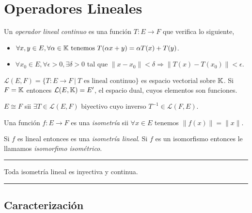 \section*{Operadores Lineales}

\begin{definition}
    Un \emph{operador lineal continuo} es una función \(T:E\to F \) que verifica lo siguiente, 
    \begin{itemize}
        \item \(\forall x,y \in E,\forall \alpha \in \mathbb{K} \ \text{tenemos } T(\alpha x+y) =  \alpha T(x) + T(y)\). 
        \item \(\forall x_0 \in E,\forall \epsilon > 0, \exists \delta > 0\) tal que \(\|x-x_0\|<\delta \Rightarrow \|T(x)-T(x_0)\|<\epsilon\). 
    \end{itemize}
 \end{definition}
\newcommand{\Lc}{\mathcal{L}}
\begin{note}
    \(\Lc(E,F)=\{T:E\to F\ |\ T \text{ es lineal continuo}\}\) es espacio vectorial sobre \(\mathbb{K}\). Si \(F = \mathbb{K}\) entonces \(\Lc(E,\K)=E'\), el espacio dual, cuyos elementos son funciones.   
\end{note}
\begin{definition}
    \(E\cong F\) sii \(\exists T\in \Lc(E,F)\) biyectivo cuyo inverso \(T^{-1}\in \Lc(F,E)\). 
\end{definition}
\begin{definition}
    Una función \(f:E\to F \) es una \emph{isometría} sii \(\forall x\in E\) tenemos \(\|f(x)\| = \|x\|\).      
\end{definition}
\begin{note}
    Si \(f\) es lineal entonces es una \emph{isometría lineal}. Si \(f\) es un isomorfismo entonces le llamamos \emph{isomorfimo isométrico}. 
\end{note}

\E 

\hrule 
\begin{exercise}
    Toda isometría lineal es inyectiva y continua. 
\end{exercise}
\hrule 

\subsection*{Caracterización}

